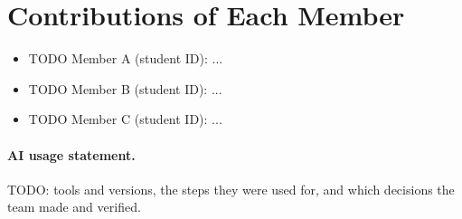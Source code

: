 \section*{Contributions of Each Member}
\begin{itemize}
  \item TODO Member A (student ID): ...
  \item TODO Member B (student ID): ...
  \item TODO Member C (student ID): ...
\end{itemize}

\paragraph{AI usage statement.}
TODO: tools and versions, the steps they were used for, and which decisions the team made and verified.
